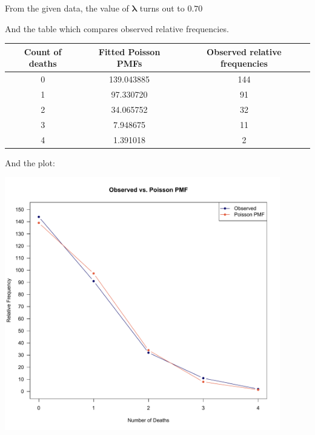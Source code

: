 \documentclass{article}
\begin{document}
From the given data, the value of $\mathbf{\lambda}$ turns out to $\mathbf{0.70}$
\bigskip

And the table which compares observed relative
frequencies.

\medskip
\begin{tabular}{*3c}\toprule
	\textbf{Count of deaths} & \textbf{Fitted Poisson PMFs} & \textbf{Observed relative frequencies}\\
	\midrule
	0 & 139.043885 & 144 \\
	1 & 97.330720 & 91 \\
	2 & 34.065752 & 32 \\
	3 & 7.948675 & 11 \\
	4 & 1.391018 & 2 \\
	\bottomrule
\end{tabular}
\bigskip

And the plot:
\vspace{-9pt}

\includegraphics[width=12cm]{poisson-plot.pdf}
\end{document}
